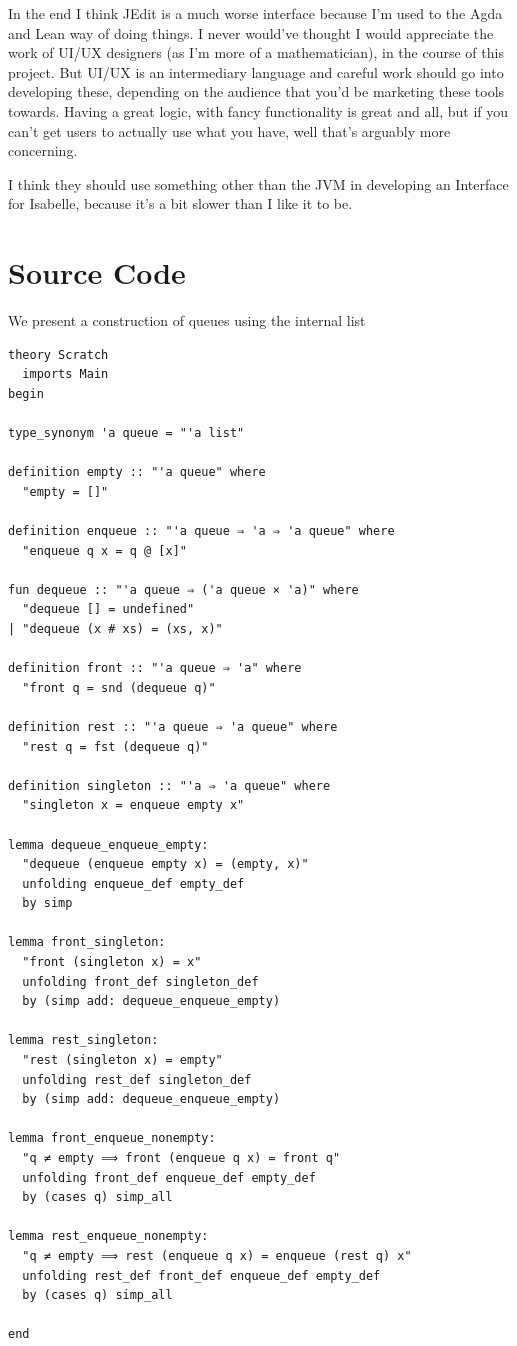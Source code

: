 \documentclass{article}
\begin{document}
In the end I think JEdit is a much worse interface because I'm used to the Agda and Lean way of doing things.
I never would've thought I would appreciate the work of UI/UX designers (as I'm more of a mathematician), in the course of this
project. But UI/UX is an intermediary language and careful work should go into developing these,
depending on the audience that you'd be marketing these tools towards. Having a great logic, with fancy
functionality is great and all, but if you can't get users to actually use what you have, well that's arguably
more concerning.

I think they should use something other than the JVM in developing an Interface for Isabelle, because
it's a bit slower than I like it to be.


\section{Source Code}

We present a construction of queues using the internal list
\begin{lstlisting}
theory Scratch
  imports Main
begin

type_synonym 'a queue = "'a list"

definition empty :: "'a queue" where
  "empty = []"

definition enqueue :: "'a queue ⇒ 'a ⇒ 'a queue" where
  "enqueue q x = q @ [x]"

fun dequeue :: "'a queue ⇒ ('a queue × 'a)" where
  "dequeue [] = undefined"
| "dequeue (x # xs) = (xs, x)"

definition front :: "'a queue ⇒ 'a" where
  "front q = snd (dequeue q)"

definition rest :: "'a queue ⇒ 'a queue" where
  "rest q = fst (dequeue q)"

definition singleton :: "'a ⇒ 'a queue" where
  "singleton x = enqueue empty x"

lemma dequeue_enqueue_empty:
  "dequeue (enqueue empty x) = (empty, x)"
  unfolding enqueue_def empty_def
  by simp

lemma front_singleton:
  "front (singleton x) = x"
  unfolding front_def singleton_def
  by (simp add: dequeue_enqueue_empty)

lemma rest_singleton:
  "rest (singleton x) = empty"
  unfolding rest_def singleton_def
  by (simp add: dequeue_enqueue_empty)

lemma front_enqueue_nonempty:
  "q ≠ empty ⟹ front (enqueue q x) = front q"
  unfolding front_def enqueue_def empty_def
  by (cases q) simp_all

lemma rest_enqueue_nonempty:
  "q ≠ empty ⟹ rest (enqueue q x) = enqueue (rest q) x"
  unfolding rest_def front_def enqueue_def empty_def
  by (cases q) simp_all

end
\end{lstlisting}
\end{document}
